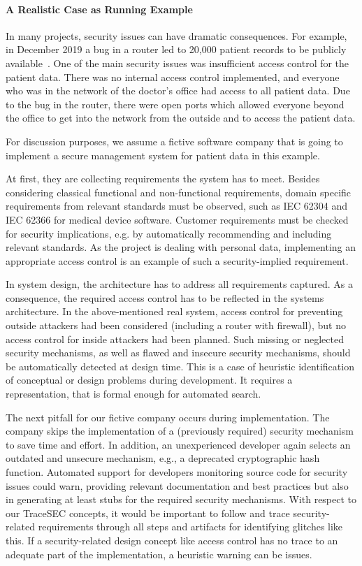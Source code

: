 \paragraph*{A Realistic Case as Running Example}
In many projects, security issues can have dramatic consequences. For example, in December 2019 a bug in a router led to 20,000 patient records to be publicly available~\cite{ct2019a}. One of the main security issues was insufficient access control for the patient data. There was no internal access control implemented, and everyone who was in the network of the doctor’s office had access to all patient data. Due to the bug in the router, there were open ports which allowed everyone beyond the office to get into the network from the outside and to access the patient data. 

For discussion purposes, we assume a fictive software company that is going to implement a secure management system for patient data in this example. 

At first, they are collecting requirements the system has to meet. Besides considering classical functional and non-functional requirements, domain specific requirements from relevant standards must be observed, such as IEC 62304 and IEC 62366 for medical device software. Customer requirements must be checked for security implications, e.g. by automatically recommending and including relevant standards. As the project is dealing with personal data, implementing an appropriate access control is an example of such a security-implied requirement.

In system design, the architecture has to address all requirements captured. As a consequence, the required access control has to be reflected in the systems architecture. In the above-mentioned real system, access control for preventing outside attackers had been considered (including a router with firewall), but no access control for inside attackers had been planned. Such missing or neglected security mechanisms, as well as flawed and insecure security mechanisms, should be automatically detected at design time. This is a case of heuristic identification of conceptual or design problems during development. It requires a representation, that is formal enough for automated search.

The next pitfall for our fictive company occurs during implementation. The company skips the implementation of a (previously required) security mechanism to save time and effort. In addition, an unexperienced developer again selects an outdated and unsecure mechanism, e.g., a deprecated cryptographic hash function. Automated support for developers monitoring source code for security issues could warn, providing relevant documentation and best practices but also in generating at least stubs for the required security mechanisms. With respect to our TraceSEC concepts, it would be important to follow and trace security-related requirements through all steps and artifacts for identifying glitches like this. If a security-related design concept like access control has no trace to an adequate part of the implementation, a heuristic warning can be issues.

